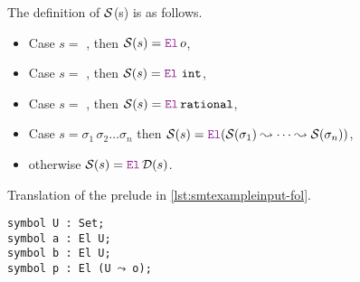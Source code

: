 \smallskip

\begin{definition}
  The definition of $\cal{S}$(s) is as follows.
  \begin{itemize}
    \item Case $s =$ , then $\Sort{s} = \el\,o$,
    \item Case $s =$ , then $\Sort{s} = \el~\tt{int}$,
    \item Case $s =$ , then $\Sort{s} = \el\,\tt{rational}$,
    \item Case $s = \sigma_1\,\sigma_2 \dots \sigma_n$ then $\Sort{s} = \el{} (\cal{S}(\sigma_1) \leadsto \dots \leadsto \cal{S}(\sigma_n))$,
    \item otherwise $\Sort{s} = \el\, \mathcal{D}(s)$.
  \end{itemize}
  \label{def:function-s}
\end{definition}

\smallskip

\begin{example}{Translation of the prelude in \cref{lst:smtexampleinput-fol}.}
\begin{lstlisting}[language=Lambdapi]
symbol U : Set;
symbol a : El U;
symbol b : El U;
symbol p : El (U ⤳ o);
\end{lstlisting}
\end{example}

\smallskip


